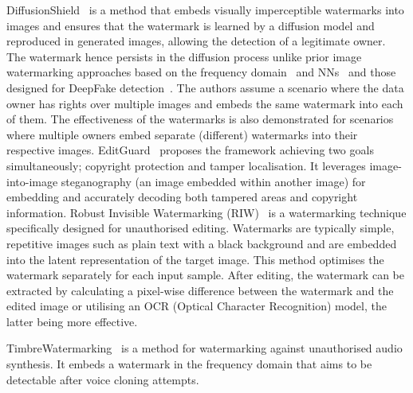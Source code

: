 \documentclass[conference]{IEEEtran}
\newcommand{\reminder}[2][]
{\todo[color=blue!18, #1]{#2}}
\begin{document}
DiffusionShield~\cite{cui_diffusionshield_2023} is a method that embeds visually imperceptible watermarks into images and ensures that the watermark is learned by a diffusion model and reproduced in generated images, allowing the detection of a legitimate owner.
The watermark hence persists in the diffusion process unlike prior image watermarking approaches based on the frequency domain~\cite{navas_dwt-dct-svd_2008} and NNs~\cite{zhu_hidden_2018} and those designed for DeepFake detection~\cite{yu_artificial_2021}.
The authors assume a scenario where the data owner has rights over multiple images and embeds the same watermark into each of them. 
The effectiveness of the watermarks is also demonstrated for scenarios where multiple owners embed separate (different) watermarks into their respective images. 
EditGuard~\cite{zhang_editguard_2023} proposes the framework achieving two goals simultaneously; copyright protection and tamper localisation. 
It leverages image-into-image steganography (an image embedded within another image) for embedding and accurately decoding both tampered areas and copyright information. 
Robust Invisible Watermarking (RIW)~\cite{tan_somewhat_2023} is a watermarking technique specifically designed for unauthorised editing. 
Watermarks are typically simple, repetitive images such as plain text with a black background and are embedded into the latent representation of the target image. 
This method optimises the watermark separately for each input sample. 
After editing, the watermark can be extracted by calculating a pixel-wise difference between the watermark and the edited image or utilising an OCR (Optical Character Recognition) model, the latter being more effective.

TimbreWatermarking~\cite{liu_detecting_2024} is a method for watermarking against unauthorised audio synthesis. 
It embeds a watermark in the frequency domain that aims to be detectable after voice cloning attempts.
\end{document}
